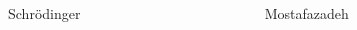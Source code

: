 \documentclass[8pt]{beamer}
\begin{document}
\begin{frame}
\begin{columns}
\begin{column}{.49\textwidth}
\begin{block}{Schrödinger}
\end{block}
\end{column}
\begin{column}{.49\textwidth}
\begin{block}{Mostafazadeh}
\end{block}
\end{column}
\end{columns}
\end{frame}
\end{document}
